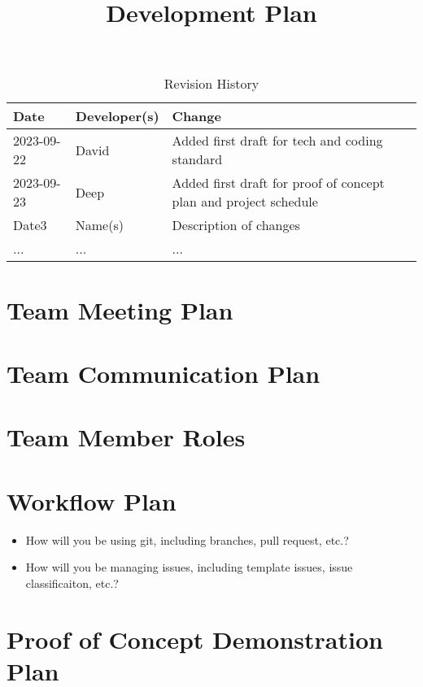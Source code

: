 \documentclass{article}
\title{Development Plan\\\progname}
\author{\authname}
\date{}
\begin{document}
\maketitle

\begin{table}[hp]
\caption{Revision History} \label{TblRevisionHistory}
\begin{tabularx}{\textwidth}{llX}
\toprule
\textbf{Date} & \textbf{Developer(s)} & \textbf{Change}\\
\midrule
2023-09-22 & David & Added first draft for tech and coding standard\\
2023-09-23 & Deep & Added first draft for proof of concept plan and project schedule\\
Date3 & Name(s) & Description of changes\\
... & ... & ...\\
\bottomrule
\end{tabularx}
\end{table}


\section{Team Meeting Plan}

\section{Team Communication Plan}

\section{Team Member Roles}

\section{Workflow Plan}

\begin{itemize}
	\item How will you be using git, including branches, pull request, etc.?
	\item How will you be managing issues, including template issues, issue
	classificaiton, etc.?
\end{itemize}

\section{Proof of Concept Demonstration Plan}
\end{document}

